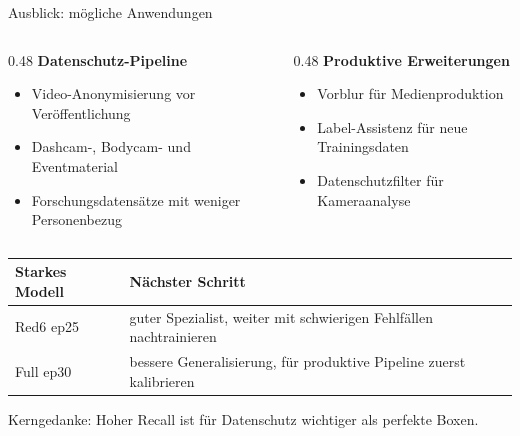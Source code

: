 \begin{frame}{Ausblick: mögliche Anwendungen}
\footnotesize
\begin{columns}[T,totalwidth=\textwidth]
\begin{column}{0.48\textwidth}
\textbf{Datenschutz-Pipeline}
\begin{itemize}\setlength\itemsep{0.22em}
    \item Video-Anonymisierung vor Veröffentlichung
    \item Dashcam-, Bodycam- und Eventmaterial
    \item Forschungsdatensätze mit weniger Personenbezug
\end{itemize}
\end{column}
\begin{column}{0.48\textwidth}
\textbf{Produktive Erweiterungen}
\begin{itemize}\setlength\itemsep{0.22em}
    \item Vorblur für Medienproduktion
    \item Label-Assistenz für neue Trainingsdaten
    \item Datenschutzfilter für Kameraanalyse
\end{itemize}
\end{column}
\end{columns}

\vspace{0.5em}
\scriptsize
\begin{tabular}{p{} p{}}
\toprule
Starkes Modell & Nächster Schritt \\
\midrule
Red6 ep25 & guter Spezialist, weiter mit schwierigen Fehlfällen nachtrainieren \\
Full ep30 & bessere Generalisierung, für produktive Pipeline zuerst kalibrieren \\
\bottomrule
\end{tabular}

\vspace{0.25em}
{\scriptsize Kerngedanke: Hoher Recall ist für Datenschutz wichtiger als perfekte Boxen.}
\end{frame}
